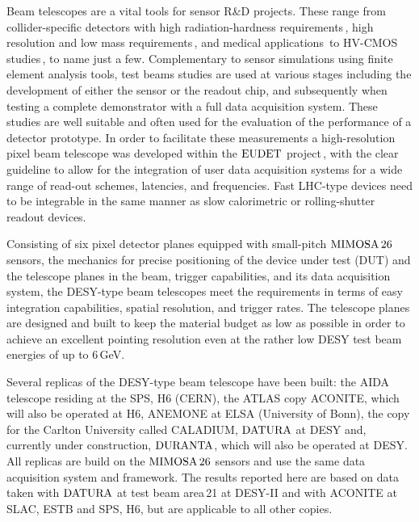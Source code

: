 

Beam telescopes are a vital tools for sensor R\&D projects. 
These range from collider-specific detectors with high radiation-hardness requirements\,\cite{Nurnberg:2014aya, Garcia-Argos:2015zda},
 high resolution and low mass requirements\,\cite{HuGuo2010480}, and medical applications\,\cite{Ballabriga2011S15} to HV-CMOS studies\,\cite{1748-0221-7-08-C08002}, to name just a few.
Complementary to sensor simulations using finite element analysis tools, test beams studies are used at various stages including the development of either the sensor or the readout chip,
 and subsequently when testing a complete demonstrator with a full data acquisition system. 
These studies are well suitable and often used for the evaluation of the performance of a detector prototype. %
In order to facilitate these measurements a high-resolution pixel beam telescope was developed within the $\textrm{EUDET}$ project\,\cite{ref:eudetreport200902},
 with the clear guideline to allow for the integration of user data acquisition systems for a wide range of read-out schemes, latencies, and frequencies. 
Fast LHC-type devices need to be integrable in the same manner as slow calorimetric or rolling-shutter readout devices. 

Consisting of six pixel detector planes equipped with small-pitch $\textrm{MIMOSA\,26}$ sensors,
 the mechanics for precise positioning of the device under test (DUT) and the telescope planes in the beam, trigger capabilities, and its data acquisition system, 
 the DESY-type beam telescopes meet the requirements in terms of easy integration capabilities, spatial resolution, and trigger rates. 
The telescope planes are designed and built to keep the material budget as low as possible in order to achieve an excellent pointing resolution
 even at the rather low DESY test beam energies of up to 6\,GeV.

Several replicas of the DESY-type beam telescope have been built:
 the AIDA telescope residing at the SPS, H6 (CERN), the ATLAS copy ACONITE, which will also be operated at H6, ANEMONE at ELSA (University of Bonn), the copy for the Carlton University called CALADIUM, 
 $\textrm{DATURA}$ at DESY and, currently under construction, $\textrm{DURANTA}$, which will also be operated at DESY. 
All replicas are build on the $\textrm{MIMOSA\,26}$ sensors and use the same data acquisition system and framework. 
The results reported here are based on data taken with $\textrm{DATURA}$ at test beam area\,21 at {DESY-II} and with ACONITE at SLAC, ESTB and SPS, H6, but are applicable to all other copies. 

